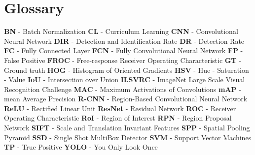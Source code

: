 % 

\chapter{Glossary}%

\textbf{ }
\smallbreak
\textbf{BN} - Batch Normalization
\bigbreak
\textbf{CL} - Curriculum Learning
\bigbreak
\textbf{CNN} - Convolutional Neural Network
\bigbreak
\textbf{DIR} - Detection and Identification Rate
\bigbreak
\textbf{DR} - Detection Rate
\bigbreak
\textbf{FC} - Fully Connected Layer
\bigbreak
\textbf{FCN} - Fully Convolutional Neural Network
\bigbreak
\textbf{FP} - False Positive
\bigbreak
\textbf{FROC} - Free-response Receiver Operating Characteristic
\bigbreak
\textbf{GT} - Ground truth
\bigbreak
\textbf{HOG} - Histogram of Oriented Gradients
\bigbreak
\textbf{HSV} - Hue - Saturation - Value
\bigbreak
\textbf{IoU} - Intersection over Union
\bigbreak
\textbf{ILSVRC} - ImageNet Large Scale Visual Recognition Challenge
\bigbreak
\textbf{MAC} - Maximum Activations of Convolutions
\bigbreak
\textbf{mAP} - mean Average Precision
\bigbreak
\textbf{R-CNN} - Region-Based Convolutional Neural Network
\bigbreak
\textbf{ReLU} - Rectified Linear Unit
\bigbreak
\textbf{ResNet} - Residual Network
\bigbreak
\textbf{ROC} - Receiver Operating Characteristic
\bigbreak
\textbf{RoI} - Region of Interest
\bigbreak
\textbf{RPN} - Region Proposal Network
\bigbreak
\textbf{SIFT} - Scale and Translation Invariant Features
\bigbreak
\textbf{SPP} - Spatial Pooling Pyramid
\bigbreak
\textbf{SSD} - Single Shot MultiBox Detector
\bigbreak
\textbf{SVM} - Support Vector Machines
\bigbreak
\textbf{TP} - True Positive
\bigbreak
\textbf{YOLO} - You Only Look Once
\bigbreak